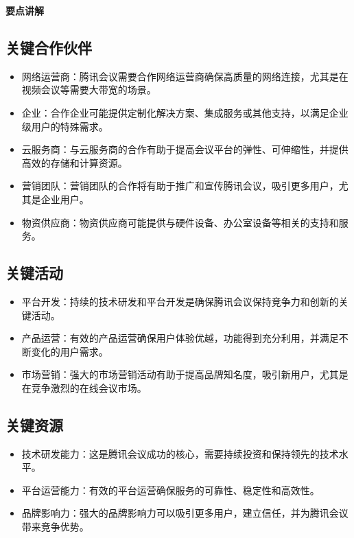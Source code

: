 \documentclass[a4paper,12pt]{article}
\begin{document}
\textbf{要点讲解}
\subsection{关键合作伙伴}
\begin{itemize}[label=--, left=0pt]
    \item 网络运营商：腾讯会议需要合作网络运营商确保高质量的网络连接，尤其是在视频会议等需要大带宽的场景。
    \item 企业：合作企业可能提供定制化解决方案、集成服务或其他支持，以满足企业级用户的特殊需求。
    \item 云服务商：与云服务商的合作有助于提高会议平台的弹性、可伸缩性，并提供高效的存储和计算资源。
    \item 营销团队：营销团队的合作将有助于推广和宣传腾讯会议，吸引更多用户，尤其是企业用户。
    \item 物资供应商：物资供应商可能提供与硬件设备、办公室设备等相关的支持和服务。
\end{itemize}

\subsection{关键活动}
\begin{itemize}[label=--, left=0pt]
    \item 平台开发：持续的技术研发和平台开发是确保腾讯会议保持竞争力和创新的关键活动。
    \item 产品运营：有效的产品运营确保用户体验优越，功能得到充分利用，并满足不断变化的用户需求。
    \item 市场营销：强大的市场营销活动有助于提高品牌知名度，吸引新用户，尤其是在竞争激烈的在线会议市场。
\end{itemize}

\subsection{关键资源}
\begin{itemize}[label=--, left=0pt]
    \item 技术研发能力：这是腾讯会议成功的核心，需要持续投资和保持领先的技术水平。
    \item 平台运营能力：有效的平台运营确保服务的可靠性、稳定性和高效性。
    \item 品牌影响力：强大的品牌影响力可以吸引更多用户，建立信任，并为腾讯会议带来竞争优势。
\end{itemize}
\end{document}
